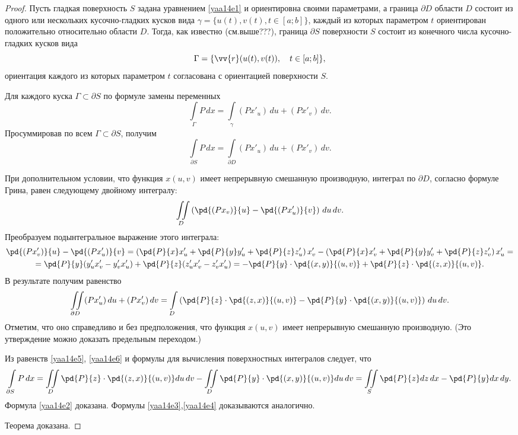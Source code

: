 \begin{proof}
Пусть гладкая поверхность $S$ задана уравнением \eqref{yaa14e1} и ориентировна своими параметрами, а граница $\partial D$ области $D$ состоит из одного или нескольких кусочно-гладких кусков вида $\gamma = \{u(t),v(t),t\in[a;b]\}$, каждый из которых параметром $t$ ориентирован положительно относительно области $D$. Тогда, как известно (см.выше???), граница $\partial S$ поверхности $S$ состоит из конечного числа кусочно-гладких кусков вида
$$
\Gamma = \{\vv{r}(u(t),v(t)),\quad t\in[a;b]\},
$$
ориентация каждого из которых параметром $t$ согласована с ориентацией поверхности $S$.

Для каждого куска $\Gamma\subset\partial S$ по формуле замены переменных
$$
\int\limits_{\Gamma} P\,dx = \int\limits_\gamma (Px'_u)\,du+(Px'_v)\,dv.
$$
Просуммировав по всем $\Gamma\subset\partial S$, получим
\begin{equation} \label{yaa14e5}
\int\limits_{\partial S} P\,dx = \int\limits_{\partial D} (Px'_u)\,du+(Px'_v)\,dv.
\end{equation}

При дополнительном условии, что функция $x(u,v)$ имеет непрерывную смешанную производную, интеграл по $\partial D$, согласно формуле Грина, равен следующему двойному интегралу:
$$
\iint\limits_D\left(\pd{(Px_v)}{u} -\pd{(Px'_u)}{v}\right)\,du\,dv.
$$
Преобразуем подынтегральное выражение этого интеграла:
\begin{multline*}
\pd{(Px'_v)}{u} - \pd{(Px'_u)}{v} = \left(\pd{P}{x}x'_u+\pd{P}{y}y'_u+\pd{P}{z}z'_u\right)x'_v-\left(\pd{P}{x}x'_v+\pd{P}{y}y'_v+\pd{P}{z}z'_v\right)x'_u =\\= \pd{P}{y}(y'_ux'_v-y'_vx'_u)+\pd{P}{z}(z'_ux'_v-z'_vx'_u)=-\pd{P}{y}\cdot \pd{(x,y)}{(u,v)}+\pd{P}{z}\cdot\pd{(z,x)}{(u,v)}.
\end{multline*}
В результате получим равенство
\begin{equation} \label{yaa14e6}
\iint\limits_{\partial D} (Px'_u)\,du+(Px'_v)\,dv = \int\limits_D\left(\pd{P}{z}\cdot\pd{(z,x)}{(u,v)}-\pd{P}{y}\cdot \pd{(x,y)}{(u,v)}\right)\,du\,dv.
\end{equation}
Отметим, что оно справедливо и без предположения, что функция $x(u,v)$ имеет непрерывную смешанную производную. (Это утверждение можно доказать предельным переходом.)

Из равенств \eqref{yaa14e5}, \eqref{yaa14e6} и формулы для вычисления поверхностных интегралов следует, что
$$
\int\limits_{\partial S} P\,dx = \iint\limits_D \pd{P}{z}\cdot\pd{(z,x)}{(u,v)}du\,dv -\iint\limits_D \pd{P}{y}\cdot\pd{(x,y)}{(u,v)}du\,dv = \iint\limits_S \pd{P}{z}dz\,dx-\pd{P}{y}dx\,dy.
$$
Формула \eqref{yaa14e2} доказана. Формулы \eqref{yaa14e3},\eqref{yaa14e4} доказываются аналогично.

Теорема доказана.
\end{proof}

